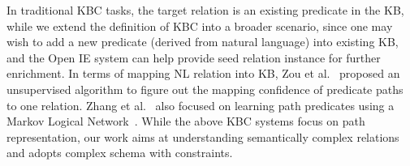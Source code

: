 In traditional KBC tasks, the target relation is an existing predicate in the KB, 
while we extend the definition of KBC into a broader scenario, since one may wish to add
a new predicate (derived from natural language) into existing KB, and the Open IE system
can help provide seed relation instance for further enrichment.
In terms of mapping NL relation into KB, Zou et al.~ proposed an unsupervised algorithm to
figure out the mapping confidence of predicate paths to one relation.
Zhang et al.~ also focused on learning path predicates using a Markov Logical Network~\cite{richardson2006markov}. 
While the above KBC systems focus on path representation, our work aims at understanding
semantically complex relations and adopts complex schema with constraints.



